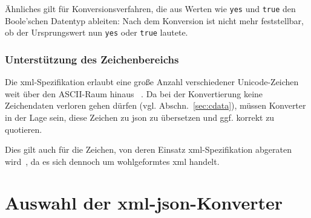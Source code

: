 Ähnliches gilt für Konversionsverfahren, die aus Werten wie \texttt{yes} und \texttt{true} den Boole'schen Datentyp ableiten: Nach dem Konversion ist nicht mehr feststellbar, ob der Ursprungswert nun \texttt{yes} oder \texttt{true} lautete.

\subsubsection{Unterstützung des Zeichenbereichs}

Die \acrshort{xml}-Spezifikation erlaubt eine große Anzahl verschiedener Unicode-Zeichen weit über den ASCII-Raum hinaus ~\cite[Regel~2]{maler2008xml}. Da bei der Konvertierung keine Zeichendaten verloren gehen dürfen (vgl. Abschn.~\ref{sec:cdata}), müssen Konverter in der Lage sein, diese Zeichen zu \acrshort{json} zu übersetzen und ggf. korrekt zu quotieren.

Dies gilt auch für die Zeichen, von deren Einsatz \acrshort{xml}-Spezifikation abgeraten wird~\cite[Abschn.~2.2]{maler2008xml}, da es sich dennoch um wohlgeformtes \acrshort{xml} handelt.

\section{Auswahl der \acrshort{xml}-\acrshort{json}-Konverter}
\label{sec:converters}

